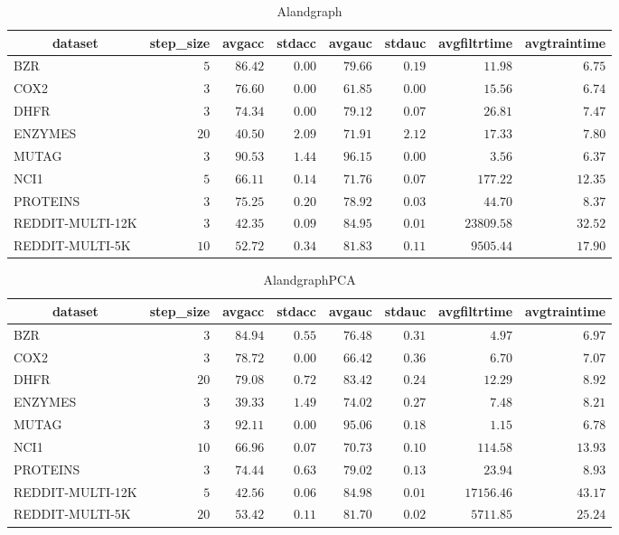 \begin{table}[!tbp]
\caption{Alandgraph\label{Alandgraph}} 
{\centering
\begin{tabular}{lrrrrrrr}
\hline\hline
\multicolumn{1}{c}{dataset}&\multicolumn{1}{c}{step_size}&\multicolumn{1}{c}{avgacc}&\multicolumn{1}{c}{stdacc}&\multicolumn{1}{c}{avgauc}&\multicolumn{1}{c}{stdauc}&\multicolumn{1}{c}{avgfiltrtime}&\multicolumn{1}{c}{avgtraintime}\tabularnewline
\hline
BZR&$ 5$&$86.42$&$0.00$&$79.66$&$0.19$&$   11.98$&$ 6.75$\tabularnewline
COX2&$ 3$&$76.60$&$0.00$&$61.85$&$0.00$&$   15.56$&$ 6.74$\tabularnewline
DHFR&$ 3$&$74.34$&$0.00$&$79.12$&$0.07$&$   26.81$&$ 7.47$\tabularnewline
ENZYMES&$20$&$40.50$&$2.09$&$71.91$&$2.12$&$   17.33$&$ 7.80$\tabularnewline
MUTAG&$ 3$&$90.53$&$1.44$&$96.15$&$0.00$&$    3.56$&$ 6.37$\tabularnewline
NCI1&$ 5$&$66.11$&$0.14$&$71.76$&$0.07$&$  177.22$&$12.35$\tabularnewline
PROTEINS&$ 3$&$75.25$&$0.20$&$78.92$&$0.03$&$   44.70$&$ 8.37$\tabularnewline
REDDIT-MULTI-12K&$ 3$&$42.35$&$0.09$&$84.95$&$0.01$&$23809.58$&$32.52$\tabularnewline
REDDIT-MULTI-5K&$10$&$52.72$&$0.34$&$81.83$&$0.11$&$ 9505.44$&$17.90$\tabularnewline
\hline
\end{tabular}}
\end{table}
\begin{table}[!tbp]
\caption{AlandgraphPCA\label{AlandgraphPCA}} 
{\centering
\begin{tabular}{lrrrrrrr}
\hline\hline
\multicolumn{1}{c}{dataset}&\multicolumn{1}{c}{step_size}&\multicolumn{1}{c}{avgacc}&\multicolumn{1}{c}{stdacc}&\multicolumn{1}{c}{avgauc}&\multicolumn{1}{c}{stdauc}&\multicolumn{1}{c}{avgfiltrtime}&\multicolumn{1}{c}{avgtraintime}\tabularnewline
\hline
BZR&$ 3$&$84.94$&$0.55$&$76.48$&$0.31$&$    4.97$&$ 6.97$\tabularnewline
COX2&$ 3$&$78.72$&$0.00$&$66.42$&$0.36$&$    6.70$&$ 7.07$\tabularnewline
DHFR&$20$&$79.08$&$0.72$&$83.42$&$0.24$&$   12.29$&$ 8.92$\tabularnewline
ENZYMES&$ 3$&$39.33$&$1.49$&$74.02$&$0.27$&$    7.48$&$ 8.21$\tabularnewline
MUTAG&$ 3$&$92.11$&$0.00$&$95.06$&$0.18$&$    1.15$&$ 6.78$\tabularnewline
NCI1&$10$&$66.96$&$0.07$&$70.73$&$0.10$&$  114.58$&$13.93$\tabularnewline
PROTEINS&$ 3$&$74.44$&$0.63$&$79.02$&$0.13$&$   23.94$&$ 8.93$\tabularnewline
REDDIT-MULTI-12K&$ 5$&$42.56$&$0.06$&$84.98$&$0.01$&$17156.46$&$43.17$\tabularnewline
REDDIT-MULTI-5K&$20$&$53.42$&$0.11$&$81.70$&$0.02$&$ 5711.85$&$25.24$\tabularnewline
\hline
\end{tabular}}
\end{table}
